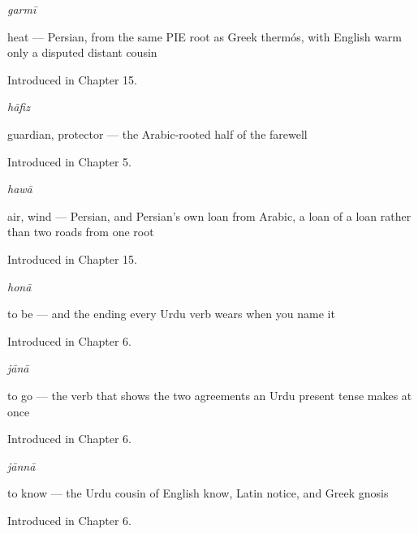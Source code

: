 \noindent\begin{minipage}[t]{\linewidth}
\raggedright
\textbf{}\enspace\emph{garmī}\par
\small heat — Persian, from the same PIE root as Greek thermós, with English warm only a disputed distant cousin\par
\footnotesize Introduced in Chapter 15.
\end{minipage}\par\medskip

\noindent\begin{minipage}[t]{\linewidth}
\raggedright
\textbf{}\enspace\emph{hāfiz}\par
\small guardian, protector — the Arabic-rooted half of the farewell\par
\footnotesize Introduced in Chapter 5.
\end{minipage}\par\medskip

\noindent\begin{minipage}[t]{\linewidth}
\raggedright
\textbf{}\enspace\emph{hawā}\par
\small air, wind — Persian, and Persian's own loan from Arabic, a loan of a loan rather than two roads from one root\par
\footnotesize Introduced in Chapter 15.
\end{minipage}\par\medskip

\noindent\begin{minipage}[t]{\linewidth}
\raggedright
\textbf{}\enspace\emph{honā}\par
\small to be — and the ending every Urdu verb wears when you name it\par
\footnotesize Introduced in Chapter 6.
\end{minipage}\par\medskip

\noindent\begin{minipage}[t]{\linewidth}
\raggedright
\textbf{}\enspace\emph{jānā}\par
\small to go — the verb that shows the two agreements an Urdu present tense makes at once\par
\footnotesize Introduced in Chapter 6.
\end{minipage}\par\medskip

\noindent\begin{minipage}[t]{\linewidth}
\raggedright
\textbf{}\enspace\emph{jānnā}\par
\small to know — the Urdu cousin of English know, Latin notice, and Greek gnosis\par
\footnotesize Introduced in Chapter 6.
\end{minipage}\par\medskip

